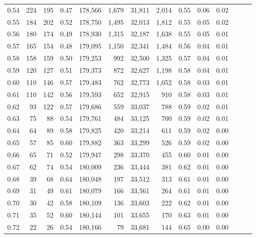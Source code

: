 \begin{tabular}{rrrrrrrrrrrrrr}
0.54 &    224 &    195 &  0.47 &  178,566 &    1,679 &  31,811 &   2,014 &  0.55 &  0.06 &      0.02 \\
0.55 &    184 &    202 &  0.52 &  178,750 &    1,495 &  32,013 &   1,812 &  0.55 &  0.05 &      0.02 \\
0.56 &    180 &    174 &  0.49 &  178,930 &    1,315 &  32,187 &   1,638 &  0.55 &  0.05 &      0.01 \\
0.57 &    165 &    154 &  0.48 &  179,095 &    1,150 &  32,341 &   1,484 &  0.56 &  0.04 &      0.01 \\
0.58 &    158 &    159 &  0.50 &  179,253 &      992 &  32,500 &   1,325 &  0.57 &  0.04 &      0.01 \\
0.59 &    120 &    127 &  0.51 &  179,373 &      872 &  32,627 &   1,198 &  0.58 &  0.04 &      0.01 \\
0.60 &    110 &    146 &  0.57 &  179,483 &      762 &  32,773 &   1,052 &  0.58 &  0.03 &      0.01 \\
0.61 &    110 &    142 &  0.56 &  179,593 &      652 &  32,915 &     910 &  0.58 &  0.03 &      0.01 \\
0.62 &     93 &    122 &  0.57 &  179,686 &      559 &  33,037 &     788 &  0.59 &  0.02 &      0.01 \\
0.63 &     75 &     88 &  0.54 &  179,761 &      484 &  33,125 &     700 &  0.59 &  0.02 &      0.01 \\
0.64 &     64 &     89 &  0.58 &  179,825 &      420 &  33,214 &     611 &  0.59 &  0.02 &      0.00 \\
0.65 &     57 &     85 &  0.60 &  179,882 &      363 &  33,299 &     526 &  0.59 &  0.02 &      0.00 \\
0.66 &     65 &     71 &  0.52 &  179,947 &      298 &  33,370 &     455 &  0.60 &  0.01 &      0.00 \\
0.67 &     62 &     74 &  0.54 &  180,009 &      236 &  33,444 &     381 &  0.62 &  0.01 &      0.00 \\
0.68 &     39 &     68 &  0.64 &  180,048 &      197 &  33,512 &     313 &  0.61 &  0.01 &      0.00 \\
0.69 &     31 &     49 &  0.61 &  180,079 &      166 &  33,561 &     264 &  0.61 &  0.01 &      0.00 \\
0.70 &     30 &     42 &  0.58 &  180,109 &      136 &  33,603 &     222 &  0.62 &  0.01 &      0.00 \\
0.71 &     35 &     52 &  0.60 &  180,144 &      101 &  33,655 &     170 &  0.63 &  0.01 &      0.00 \\
0.72 &     22 &     26 &  0.54 &  180,166 &       79 &  33,681 &     144 &  0.65 &  0.00 &      0.00 \\

\end{tabular}
